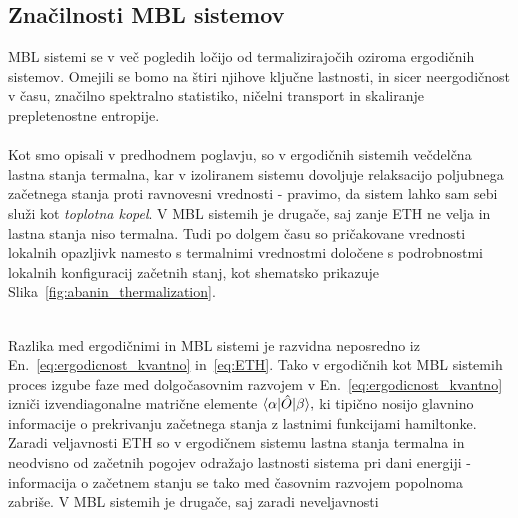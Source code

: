 \subsection{Značilnosti MBL sistemov }
\label{znacilnosti_MBL_sistemov}
MBL sistemi se v več pogledih ločijo od termalizirajočih oziroma ergodičnih sistemov. Omejili se bomo na štiri njihove ključne lastnosti, in sicer neergodičnost v času, značilno spektralno statistiko, ničelni transport in skaliranje prepletenostne entropije. \\\\
Kot smo opisali v predhodnem poglavju, so v ergodičnih sistemih večdelčna lastna stanja termalna, kar v izoliranem sistemu dovoljuje relaksacijo poljubnega začetnega stanja proti ravnovesni vrednosti - pravimo, da sistem lahko sam sebi služi kot \emph{toplotna kopel}. V MBL sistemih je drugače, saj zanje ETH ne velja in lastna stanja niso termalna. Tudi po dolgem času so pričakovane vrednosti lokalnih opazljivk namesto s termalnimi vrednostmi določene s podrobnostmi lokalnih konfiguracij začetnih stanj, kot shematsko prikazuje Slika~\ref{fig:abanin_thermalization}.\\\\
\begin{minipage}[t]{0.44\textwidth}
\noindent 
Razlika med ergodičnimi in MBL sistemi je razvidna neposredno iz En.~\eqref{eq:ergodicnost_kvantno} in~\eqref{eq:ETH}. Tako v ergodičnih kot MBL sistemih proces izgube faze med dolgočasovnim razvojem v En.~\eqref{eq:ergodicnost_kvantno} izniči izvendiagonalne matrične elemente $\langle \alpha \vert\hat{O}\vert\beta\rangle,$ ki tipično nosijo glavnino informacije o prekrivanju začetnega stanja z lastnimi funkcijami hamiltonke. Zaradi veljavnosti ETH so v ergodičnem sistemu lastna stanja termalna in neodvisno od začetnih pogojev odražajo lastnosti sistema pri dani energiji - informacija o začetnem stanju se tako med časovnim razvojem popolnoma zabriše. V MBL sistemih je drugače, saj zaradi neveljavnosti
\end{minipage}\hfill
